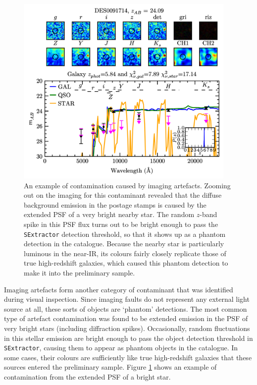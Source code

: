\begin{figure}[tb]
\centering
\includegraphics[width=0.95\textwidth]{Chapter4/Figs/DES0091714_thesis.png}
\caption[Example of contamination from an imaging artefact]{An example of contamination caused by imaging artefacts. Zooming out on the imaging for this contaminant revealed that the diffuse background emission in the postage stamps is caused by the extended PSF of a very bright nearby star. The random $z$-band spike in this PSF flux turns out to be bright enough to pass the \texttt{SExtractor} detection threshold, so that it shows up as a phantom detection in the \DESVIDEO catalogue. Because the nearby star is particularly luminous in the near-IR, its colours fairly closely replicate those of true high-redshift galaxies, which caused this phantom detection to make it into the preliminary sample.}
\label{fig:example_artefact}
\end{figure}

Imaging artefacts form another category of contaminant that was identified during visual inspection. Since imaging faults do not represent any external light source at all, these sorts of objects are `phantom' detections. The most common type of artefact contamination was found to be extended emission in the PSF of very bright stars (including diffraction spikes). Occasionally, random fluctuations in this stellar emission are bright enough to pass the object detection threshold in \texttt{SExtractor}, causing them to appear as phantom objects in the \DESVIDEO catalogue. In some cases, their colours are sufficiently like true high-redshift galaxies that these sources entered the preliminary sample. Figure \ref{fig:example_artefact} shows an example of contamination from the extended PSF of a bright star. \par


